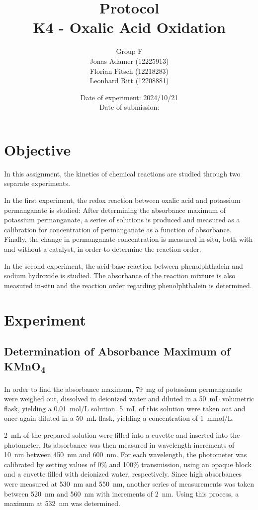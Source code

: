 \documentclass[titlepage]{article}
\title{Protocol \\ K4 - Oxalic Acid Oxidation}
\author{Group F\\Jonas Adamer (12225913)\\Florian Fitsch (12218283)\\Leonhard Ritt (12208881)}
\date{Date of experiment: 2024/10/21\\Date of submission:}
\begin{document}
\maketitle
\thispagestyle{empty}

\newpage
\tableofcontents
\thispagestyle{empty}

\addtocounter{page}{-1}

\newpage
\section{Objective}
In this assignment, the kinetics of chemical reactions are studied through two separate experiments.

In the first experiment, the redox reaction between oxalic acid and potassium permanganate is studied: After determining the absorbance maximum of potassium permanganate, a series of solutions is produced and measured as a calibration for concentration of permanganate as a function of absorbance. Finally, the change in permanganate-concentration is measured in-situ, both with and without a catalyst, in order to determine the reaction order.

In the second experiment, the acid-base reaction between phenolphthalein and sodium hydroxide is studied. The absorbance of the reaction mixture is also measured in-situ and the reaction order regarding phenolphthalein is determined.

\section{Experiment}
\subsection{Determination of Absorbance Maximum of KMnO\texorpdfstring{\textsubscript{4}}{4}} \label{ssec_experiment_abs_maximum}
In order to find the absorbance maximum, 79~mg of potassium permanganate were weighed out, dissolved in deionized water and diluted in a 50~mL volumetric flask, yielding a 0.01~mol/L solution. 5~mL of this solution were taken out and once again diluted in a 50~mL flask, yielding a concentration of 1~mmol/L.

2~mL of the prepared solution were filled into a cuvette and inserted into the photometer. Its absorbance was then measured in wavelength increments of 10~nm between 450~nm and 600~nm. For each wavelength, the photometer was calibrated by setting values of 0\% and 100\% transmission, using an opaque block and a cuvette filled with deionized water, respectively. Since high absorbances were measured at 530~nm and 550~nm, another series of measurements was taken between 520~nm and 560~nm with increments of 2~nm. Using this process, a maximum at 532~nm was determined.
\end{document}
